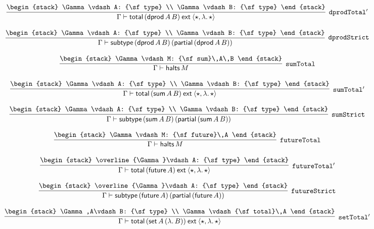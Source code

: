 \[
\infer[{\tt dprodTotal'}]{\Gamma \vdash {\sf total}\,({\sf dprod}\,A\,B)\:{\sf ext}\:\langle \star ,\lambda .\,\star \rangle }{
\begin{stack}
\Gamma \vdash A: {\sf type}
\\
\Gamma \vdash B: {\sf type}
\end{stack}}
\]

\[
\infer[{\tt dprodStrict}]{\Gamma \vdash {\sf subtype}\,({\sf dprod}\,A\,B)\,({\sf partial}\,({\sf dprod}\,A\,B))}{
\begin{stack}
\Gamma \vdash A: {\sf type}
\\
\Gamma \vdash B: {\sf type}
\end{stack}}
\]

\[
\infer[{\tt sumTotal}]{\Gamma \vdash {\sf halts}\,M}{
\begin{stack}
\Gamma \vdash M: {\sf sum}\,A\,B
\end{stack}}
\]

\[
\infer[{\tt sumTotal'}]{\Gamma \vdash {\sf total}\,({\sf sum}\,A\,B)\:{\sf ext}\:\langle \star ,\lambda .\,\star \rangle }{
\begin{stack}
\Gamma \vdash A: {\sf type}
\\
\Gamma \vdash B: {\sf type}
\end{stack}}
\]

\[
\infer[{\tt sumStrict}]{\Gamma \vdash {\sf subtype}\,({\sf sum}\,A\,B)\,({\sf partial}\,({\sf sum}\,A\,B))}{
\begin{stack}
\Gamma \vdash A: {\sf type}
\\
\Gamma \vdash B: {\sf type}
\end{stack}}
\]

\[
\infer[{\tt futureTotal}]{\Gamma \vdash {\sf halts}\,M}{
\begin{stack}
\Gamma \vdash M: {\sf future}\,A
\end{stack}}
\]

\[
\infer[{\tt futureTotal'}]{\Gamma \vdash {\sf total}\,({\sf future}\,A)\:{\sf ext}\:\langle \star ,\lambda .\,\star \rangle }{
\begin{stack}
\overline{\Gamma}\vdash A: {\sf type}
\end{stack}}
\]

\[
\infer[{\tt futureStrict}]{\Gamma \vdash {\sf subtype}\,({\sf future}\,A)\,({\sf partial}\,({\sf future}\,A))}{
\begin{stack}
\overline{\Gamma}\vdash A: {\sf type}
\end{stack}}
\]

\[
\infer[{\tt setTotal'}]{\Gamma \vdash {\sf total}\,({\sf set}\,A\,(\lambda .\,B))\:{\sf ext}\:\langle \star ,\lambda .\,\star \rangle }{
\begin{stack}
\Gamma ,A\vdash B: {\sf type}
\\
\Gamma \vdash {\sf total}\,A
\end{stack}}
\]

